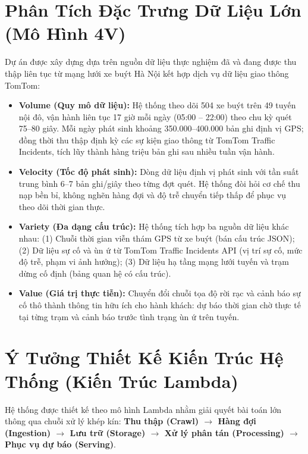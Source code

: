 \documentclass[11pt,a4paper]{article}
\begin{document}
\section{Phân Tích Đặc Trưng Dữ Liệu Lớn (Mô Hình 4V)}
Dự án được xây dựng dựa trên nguồn dữ liệu thực nghiệm đã và đang được thu thập liên tục từ mạng lưới xe buýt Hà Nội kết hợp dịch vụ dữ liệu giao thông TomTom:
\begin{itemize}[leftmargin=*,noitemsep,topsep=1.5pt]
    \item \textbf{Volume (Quy mô dữ liệu):} Hệ thống theo dõi 504 xe buýt trên 49 tuyến nội đô, vận hành liên tục 17 giờ mỗi ngày (05:00 -- 22:00) theo chu kỳ quét 75--80 giây. Mỗi ngày phát sinh khoảng 350.000--400.000 bản ghi định vị GPS; đồng thời thu thập định kỳ các sự kiện giao thông từ TomTom Traffic Incidents, tích lũy thành hàng triệu bản ghi sau nhiều tuần vận hành.
    \item \textbf{Velocity (Tốc độ phát sinh):} Dòng dữ liệu định vị phát sinh với tần suất trung bình 6--7 bản ghi/giây theo từng đợt quét. Hệ thống đòi hỏi cơ chế thu nạp bền bỉ, không nghẽn hàng đợi và độ trễ chuyển tiếp thấp để phục vụ theo dõi thời gian thực.
    \item \textbf{Variety (Đa dạng cấu trúc):} Hệ thống tích hợp ba nguồn dữ liệu khác nhau: (1) Chuỗi thời gian viễn thám GPS từ xe buýt (bán cấu trúc JSON); (2) Dữ liệu sự cố và ùn ứ từ TomTom Traffic Incidents API (vị trí sự cố, mức độ trễ, phạm vi ảnh hưởng); (3) Dữ liệu hạ tầng mạng lưới tuyến và trạm dừng cố định (bảng quan hệ có cấu trúc).
    \item \textbf{Value (Giá trị thực tiễn):} Chuyển đổi chuỗi tọa độ rời rạc và cảnh báo sự cố thô thành thông tin hữu ích cho hành khách: dự báo thời gian chờ thực tế tại từng trạm và cảnh báo trước tình trạng ùn ứ trên tuyến.
\end{itemize}

\section{Ý Tưởng Thiết Kế Kiến Trúc Hệ Thống (Kiến Trúc Lambda)}
Hệ thống được thiết kế theo mô hình Lambda nhằm giải quyết bài toán lớn thông qua chuỗi xử lý khép kín: \textbf{Thu thập (Crawl) $\to$ Hàng đợi (Ingestion) $\to$ Lưu trữ (Storage) $\to$ Xử lý phân tán (Processing) $\to$ Phục vụ dự báo (Serving)}.
\end{document}
